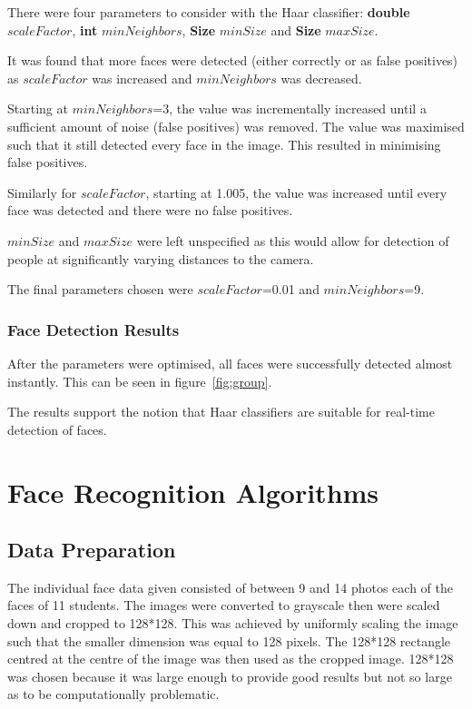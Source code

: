 \documentclass{article}
\begin{document}
There were four parameters to consider with the Haar classifier: \textbf{double} $scaleFactor$, \textbf{int} $minNeighbors$, \textbf{Size} $minSize$ and \textbf{Size} $maxSize$.

It was found that more faces were detected (either correctly or as false positives) as $scaleFactor$ was increased and $minNeighbors$ was decreased.

Starting at $minNeighbors$=3, the value was incrementally increased until a sufficient amount of noise (false positives) was removed. The value was maximised such that it still detected every face in the image. This resulted in minimising false positives.

Similarly for $scaleFactor$, starting at 1.005, the value was increased until every face was detected and there were no false positives.

$minSize$ and $maxSize$ were left unspecified as this would allow for detection of people at significantly varying distances to the camera.

The final parameters chosen were $scaleFactor$=0.01 and $minNeighbors$=9.

\subsubsection{Face Detection Results}
After the parameters were optimised, all faces were successfully detected almost instantly. This can be seen in figure~\ref{fig:group}.

The results support the notion that Haar classifiers are suitable for real-time detection of faces.

\section{Face Recognition Algorithms}
\subsection{Data Preparation}
The individual face data given consisted of between 9 and 14 photos each of the faces of 11 students. The images were converted to grayscale then were scaled down and cropped to 128*128. This was achieved by uniformly scaling the image such that the smaller dimension was equal to 128 pixels. The 128*128 rectangle centred at the centre of the image was then used as the cropped image. 128*128 was chosen because it was large enough to provide good results but not so large as to be computationally problematic.
\end{document}
